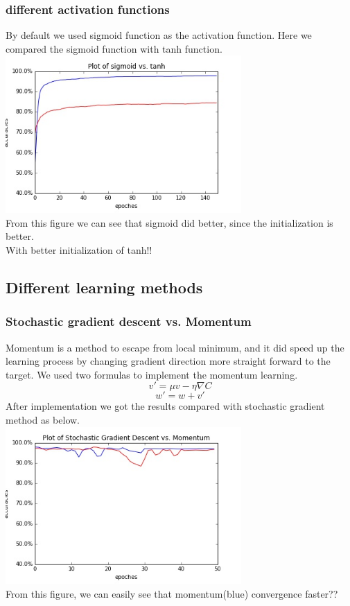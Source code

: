 \documentclass[12pt,a4paper]{article}
\begin{document}
\subsubsection{different activation functions}
By default we used sigmoid function as the activation function. Here we compared the sigmoid function with tanh function.\\
\includegraphics[width=90mm,scale=1]{p301.jpg}\\
From this figure we can see that sigmoid did better, since the initialization is better.\\
With better initialization of tanh!!


\subsection{Different learning methods}
\subsubsection{Stochastic gradient descent vs. Momentum}
Momentum is a method to escape from local minimum, and it did speed up the learning process by changing gradient direction more straight forward to the target. We used two formulas to implement the momentum learning.
\[v' = \mu v - \eta \nabla C\]
\[w' = w + v'\]
After implementation we got the results compared with stochastic gradient method as below.\\
\includegraphics[width=90mm,scale=1]{p401.jpg}\\
From this figure, we can easily see that momentum(blue) convergence faster??
\end{document}
